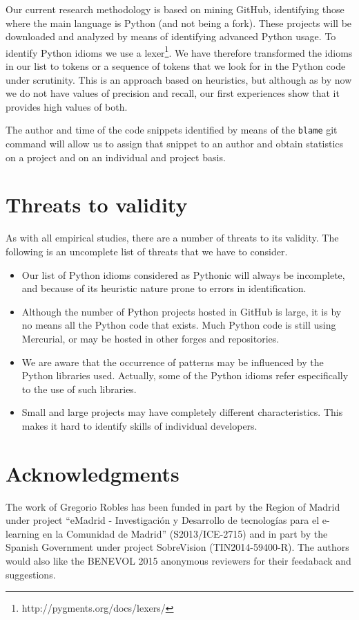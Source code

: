 \documentclass[conference]{IEEEtran}
\begin{document}
Our current research methodology is based on mining GitHub, identifying those where the main language is Python (and not being a fork). These projects will be downloaded and analyzed by means of identifying advanced Python usage. To identify Python idioms we use a lexer\footnote{http://pygments.org/docs/lexers/}. We have therefore transformed the idioms in our list to tokens or a sequence of tokens that we look for in the Python code under scrutinity. This is an approach based on heuristics, but although as by now we do not have values of precision and recall, our first experiences show that it provides high values of both.

The author and time of the code snippets identified by means of the \texttt{blame} git command will allow us to assign that snippet to an author and obtain statistics on a project and on an individual and project basis.

\section{Threats to validity}

As with all empirical studies, there are a number of threats to its validity. The following is an uncomplete list of threats that we have to consider.

\begin{itemize}
  \item Our list of Python idioms considered as Pythonic will always be incomplete, and because of its heuristic nature prone to errors in identification.
  \item Although the number of Python projects hosted in GitHub is large, it is by no means all the Python code that exists. Much Python code is still using Mercurial, or may be hosted in other forges and repositories.
  \item We are aware that the occurrence of patterns may be influenced by the Python libraries used. Actually, some of the Python idioms refer especifically to the use of such libraries.
  \item Small and large projects may have completely different characteristics. This makes it hard to identify skills of individual developers.
\end{itemize}


\section{Acknowledgments}

The work of Gregorio Robles has been funded in part by the Region of Madrid under project ``eMadrid - Investigación y Desarrollo de tecnologías para el e-learning en la Comunidad de Madrid'' (S2013/ICE-2715) and in part by the Spanish Government under project SobreVision (TIN2014-59400-R). The authors would also like the BENEVOL 2015 anonymous reviewers for their feedaback and suggestions.


\end{document}
